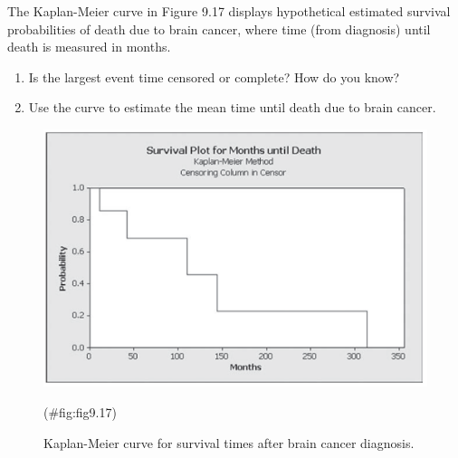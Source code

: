 \documentclass[
]{report}
\begin{document}
\begin{list}{E.}{ \setlength{\itemsep}{1.2em}}
  \item The Kaplan-Meier curve in Figure 9.17 displays hypothetical estimated survival probabilities of death due to brain cancer, where time (from diagnosis) until death is measured in months.
  \begin{enumerate}
    \item Is the largest event time censored or complete? How do you know?
    \item Use the curve to estimate the mean time until death due to brain cancer.
  \end{enumerate}

\begin{figure}

{\centering \includegraphics[width=1\linewidth]{docs/Fig9_17} 

}

\caption{Kaplan-Meier curve for survival times after brain cancer diagnosis.}(\#fig:fig9.17)
\end{figure}


\end{list}
\end{document}
